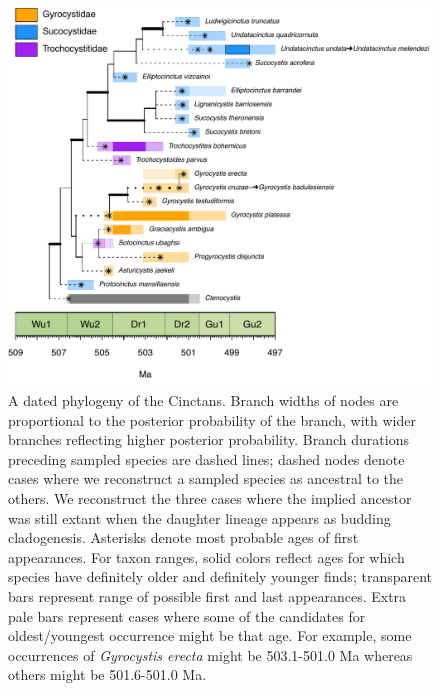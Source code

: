 \documentclass{article}
\begin{document}
\begin{figure}
  \includegraphics[width=\textwidth]{figures/Pretty Cinctans Families.pdf}

  \caption{A dated phylogeny of the Cinctans. Branch widths of nodes are proportional to the posterior probability of the branch, with wider branches reflecting higher posterior probability. Branch durations preceding sampled species are dashed lines; dashed nodes denote cases where we reconstruct a sampled species as ancestral to the others.  We reconstruct the three cases where the implied ancestor was still extant when the daughter lineage appears as budding cladogenesis.  Asterisks denote most probable ages of first appearances.  For taxon ranges, solid colors reflect ages for which species have definitely older and definitely younger finds; transparent bars represent range of possible first and last appearances.  Extra pale bars represent cases where some of the candidates for oldest/youngest occurrence might be that age. For example,  some occurrences of \textit{Gyrocystis erecta} might be 503.1-501.0 Ma whereas others might be 501.6-501.0 Ma.  }
\end{figure}
\end{document}
